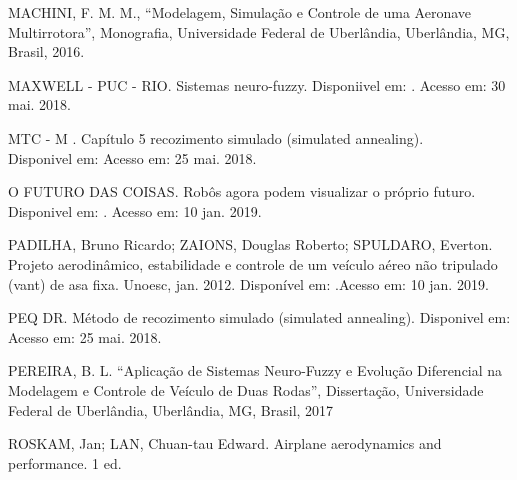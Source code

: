 \documentclass[10pt,a4paper]{article}
\numberwithin{equation}{section}
\begin{document}
\par MACHINI, F. M. M., “Modelagem, Simulação e Controle de uma Aeronave Multirrotora”, Monografia, Universidade Federal de Uberlândia, Uberlândia, MG, Brasil, 2016. \\

\par MAXWELL - PUC - RIO. Sistemas neuro-fuzzy. Disponiivel em: \hfill \break {}. Acesso em: 30 mai. 2018.\\

\par MTC - M . Capítulo 5 recozimento simulado (simulated annealing). \\
Disponivel em: \hfill \break {} Acesso em: 25 mai. 2018.\\

\par O FUTURO DAS COISAS. Robôs agora podem visualizar o próprio futuro. Disponivel em:  \hfill \break
{}. Acesso em: 10 jan. 2019.\\

\par PADILHA, Bruno Ricardo; ZAIONS, Douglas Roberto; SPULDARO, Everton. Projeto aerodinâmico, estabilidade e controle de um veículo aéreo não tripulado (vant) de asa fixa. Unoesc,  jan. 2012. Disponível em: \hfill \break {}.Acesso em: 10 jan. 2019.\\

\par PEQ DR. Método de recozimento simulado (simulated annealing). Disponivel em: \hfill \break
{} Acesso em: 25 mai. 2018.\\

\par PEREIRA, B. L. “Aplicação de Sistemas Neuro-Fuzzy e Evolução Diferencial na Modelagem e Controle de Veículo de Duas Rodas”, Dissertação, Universidade Federal de Uberlândia, Uberlândia, MG, Brasil, 2017\\

\par ROSKAM, Jan; LAN, Chuan-tau Edward. Airplane aerodynamics and performance. 1 ed.\\
\end{document}
